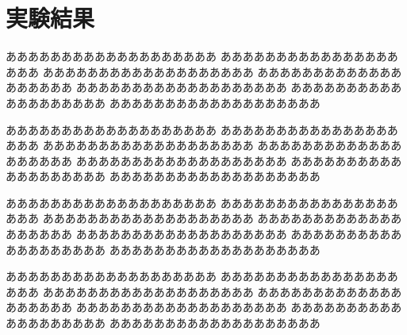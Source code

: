 \section{実験結果}
あああああああああああああああああああ
あああああああああああああああああああ
あああああああああああああああああああ
あああああああああああああああああああ
あああああああああああああああああああ
あああああああああああああああああああ
あああああああああああああああああああ

あああああああああああああああああああ
あああああああああああああああああああ
あああああああああああああああああああ
あああああああああああああああああああ
あああああああああああああああああああ
あああああああああああああああああああ
あああああああああああああああああああ

あああああああああああああああああああ
あああああああああああああああああああ
あああああああああああああああああああ
あああああああああああああああああああ
あああああああああああああああああああ
あああああああああああああああああああ
あああああああああああああああああああ

あああああああああああああああああああ
あああああああああああああああああああ
あああああああああああああああああああ
あああああああああああああああああああ
あああああああああああああああああああ
あああああああああああああああああああ
あああああああああああああああああああ
